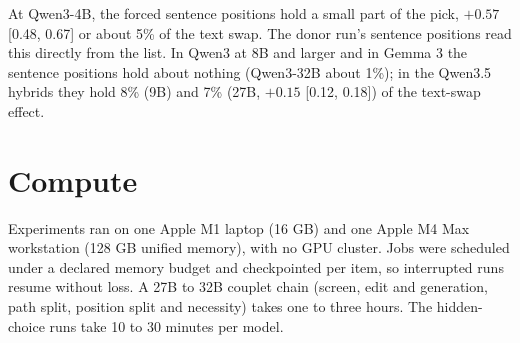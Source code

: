 \documentclass[
]{article}
\begin{document}
At Qwen3-4B, the forced sentence positions hold a small part of the
pick, \(+0.57\) {[}0.48, 0.67{]} or about 5\% of the text swap. The
donor run's sentence positions read this directly from the list. In
Qwen3 at 8B and larger and in Gemma 3 the sentence positions hold about
nothing (Qwen3-32B about 1\%); in the Qwen3.5 hybrids they hold 8\% (9B)
and 7\% (27B, \(+0.15\) {[}0.12, 0.18{]}) of the text-swap effect.

\section{Compute}\label{sec-app-compute}

Experiments ran on one Apple M1 laptop (16 GB) and one Apple M4 Max
workstation (128 GB unified memory), with no GPU cluster. Jobs were
scheduled under a declared memory budget and checkpointed per item, so
interrupted runs resume without loss. A 27B to 32B couplet chain
(screen, edit and generation, path split, position split and necessity)
takes one to three hours. The hidden-choice runs take 10 to 30 minutes
per model.
\end{document}

